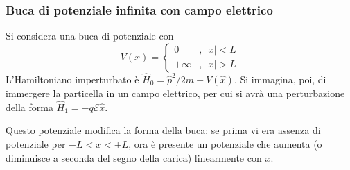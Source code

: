 \documentclass[11pt, a4paper]{scrartcl} %
\numberwithin{equation}{subsection}
\theoremstyle{style2}
\theoremstyle{style1}
\begin{document}
\subsubsection{Buca di potenziale infinita con campo elettrico}

Si considera una buca di potenziale con 
\[
V(x) = \begin{cases}
	 0 &,\ \lvert x \rvert < L \\
	 +\infty &,\ \lvert x \rvert > L
\end{cases}
\] 
L'Hamiltoniano imperturbato \`e $\hat{H}_0 = \hat{p}^2 / 2m + V(\hat{x})$. 
Si immagina, poi, di immergere la particella in un campo elettrico, per cui si avr\`a una perturbazione della forma $\hat{H}_1 = - q \mathcal{E} \hat{x} $.

Questo potenziale modifica la forma della buca: se prima vi era assenza di potenziale per $-L < x< +L$, ora \`e presente un potenziale che aumenta (o diminuisce a seconda del segno della carica) linearmente con $x$.
\end{document}
